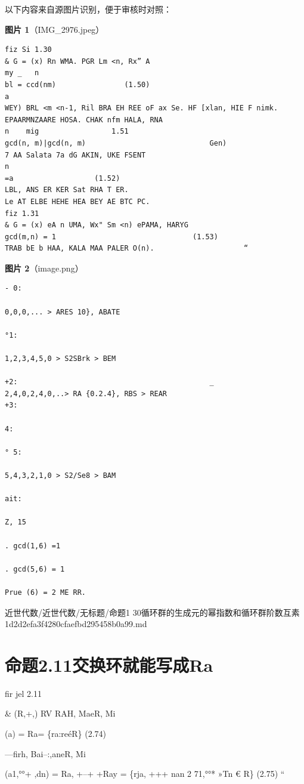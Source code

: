 \begin{note}
以下内容来自源图片识别，便于审核时对照：

\textbf{图片 1}（IMG\_2976.jpeg）
\begin{Verbatim}[fontsize=\small]
fiz Si 1.30
& G = (x) Rn WMA. PGR Lm <n, Rx” A
my _   n
bl = ccd(nm)                (1.50)
a
WEY) BRL <m <n-1, Ril BRA EH REE oF ax Se. HF [xlan, HIE F nimk.
EPAARMNZAARE HOSA. CHAK nfm HALA, RNA
n    mig                 1.51
gcd(n, m)|gcd(n, m)                             Gen)
7 AA Salata 7a dG AKIN, UKE FSENT
n
=a                   (1.52)
LBL, ANS ER KER Sat RHA T ER.
Le AT ELBE HEHE HEA BEY AE BTC PC.
fiz 1.31
& G = (x) eA n UMA, Wx" Sm <n) ePAMA, HARYG
gcd(m,n) = 1                                (1.53)
TRAB bE b HAA, KALA MAA PALER O(n).                     “
\end{Verbatim}

\textbf{图片 2}（image.png）
\begin{Verbatim}[fontsize=\small]
- 0:

0,0,0,... > ARES 10}, ABATE

°1:

1,2,3,4,5,0 > S2SBrk > BEM

+2:                                             _
2,4,0,2,4,0,..> RA {0.2.4}, RBS > REAR
+3:

4:

° 5:

5,4,3,2,1,0 > S2/Se8 > BAM

ait:

Z, 15

. gcd(1,6) =1

. gcd(5,6) = 1

Prue (6) = 2 ME RR.
\end{Verbatim}

\end{note}

\begin{note}[来源路径]

近世代数/近世代数/无标题/命题1 30循环群的生成元的幂指数和循环群阶数互素 1d2d2efa3f4280cfaefbd295458b0a99.md

\end{note}

\section*{命题2.11交换环就能写成Ra}

\begin{proposition}[命题2.11交换环就能写成Ra]

fir jel 2.11

\& (R,+,) RV RAH, MaeR, Mi

(a) = Ra= \{ra:reéR\}                    (2.74)

—firh, Bai--:,aneR, Mi

(a1,°°+ ,dn) = Ra, +--+ +Ray = \{rja, +++ nan 2 71,°°* »Tn € R\}          (2.75) “

\end{proposition}

